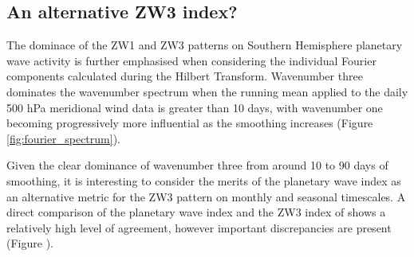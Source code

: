 \subsection{An alternative ZW3 index?}

The dominace of the ZW1 and ZW3 patterns on Southern Hemisphere planetary wave activity is further emphasised when considering the individual Fourier components calculated during the Hilbert Transform. Wavenumber three dominates the wavenumber spectrum when the running mean applied to the daily 500 hPa meridional wind data is greater than 10 days, with wavenumber one becoming progressively more influential as the smoothing increases (Figure \ref{fig:fourier_spectrum}).

Given the clear dominance of wavenumber three from around 10 to 90 days of smoothing, it is interesting to consider the merits of the planetary wave index as an alternative metric for the ZW3 pattern on monthly and seasonal timescales. A direct comparison of the planetary wave index and the ZW3 index of \citet{Raphael2004} shows a relatively high level of agreement, however important discrepancies are present (Figure \label{fig:metric_vs_zw3}).  


